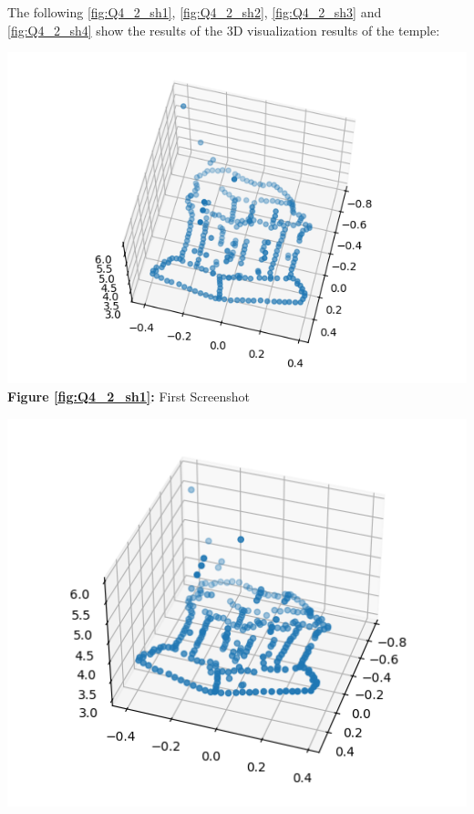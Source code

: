 \begin{your_solution}[title=Q4.2,height=17.5cm,width=\linewidth]
The following \autoref{fig:Q4_2_sh1}, \autoref{fig:Q4_2_sh2}, \autoref{fig:Q4_2_sh3} and \autoref{fig:Q4_2_sh4} show the results of the 3D visualization results of the temple:
\newline

\begin{minipage}{0.55\linewidth}
	\centering
	\includegraphics[width=\linewidth]{../Q4_2_sh1.png}
	\textbf{Figure \ref{fig:Q4_2_sh1}:} First Screenshot  %
	\label{fig:Q4_2_sh1}         %
\end{minipage}
\hfill
\begin{minipage}{0.45\linewidth}
	\centering
	\includegraphics[width=\linewidth]{../Q4_2_sh2.png}

\end{minipage}
\end{your_solution}
